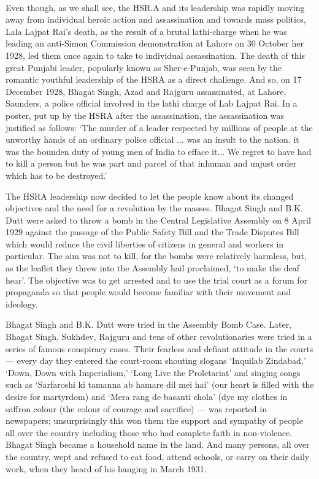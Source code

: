 \paragraph*{}


Even though, as we shall see, the HSR.A and its leadership was rapidly moving away from individual heroic action and assassination and towards mass politics, Lala Lajpat Rai's death, as the result of a brutal lathi-charge when he was leading an anti-Simon Commission demonstration at Lahore on 30 October her 1928, led them once again to take to individual assassination. The death of this great Punjabi leader, popularly known as Sher-e-Punjab, was seen by the romantic youthful leadership of the HSRA as a direct challenge. And so, on 17 December 1928, Bhagat Singh, Azad and Rajguru assassinated, at Lahore, Saunders, a police official involved in the lathi charge of Lab Lajpat Rai. In a poster, put up by the HSRA after the assassination, the assassination was justified as follows: `The murder of a leader respected by millions of people at the unworthy hands of an ordinary police official ... was an insult to the nation. it was the bounden duty of young men of India to efface it... We regret to have had to kill a person but he was part and parcel of that inhuman and unjust order which has to be destroyed.'

The HSRA leadership now decided to let the people know about its changed objectives and the need for a revolution by the masses. Bhagat Singh and B.K. Dutt were asked to throw a bomb in the Central Legislative Assembly on 8 April 1929 against the passage of the Public Safety Bill and the Trade Disputes Bill which would reduce the civil liberties of citizens in general and workers in particular. The aim was not to kill, for the bombs were relatively harmless, but, as the leaflet they threw into the Assembly hail proclaimed, `to make the deaf hear'. The objective was to get arrested and to use the trial court as a forum for propaganda so that people would become familiar with their movement and ideology.

Bhagat Singh and B.K. Dutt were tried in the Assembly Bomb Case. Later, Bhagat Singh, Sukhdev, Rajguru and tens of other revolutionaries were tried in a series of famous conspiracy cases. Their fearless and defiant attitude in the courts — every day they entered the court-room shouting slogans `Inquilab Zindabad,' `Down, Down with Imperialism,' `Long Live the Proletariat' and singing songs such as `Sarfaroshi ki tamanna ab hamare dil mei hai' (our heart is filled with the desire for martyrdom) and `Mera rang de basanti chola' (dye my clothes in saffron colour (the colour of courage and sacrifice) — was reported in newspapers; unsurprisingly this won them the support and sympathy of people all over the country including those who had complete faith in non-violence. Bhagat Singh became a household name in the land. And many persons, all over the country, wept and refused to eat food, attend schools, or carry on their daily work, when they heard of his hanging in March 1931.

